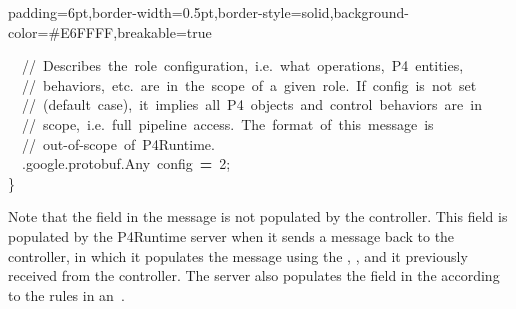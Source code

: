 \documentclass[11pt]{article}
\begin{document}
{\begin{mdbmargintb}{6pt}{6pt}
\begin{mdblock}{padding=6pt,border-width=0.5pt,border-style=solid,background-color=\#E6FFFF,breakable=true}
\begin{mdpre}
{{~~{//~Describes~the~role~configuration,~i.e.~what~operations,~P4~entities,}\\
~~{//~behaviors,~etc.~are~in~the~scope~of~a~given~role.~If~config~is~not~set}\\
~~{//~(default~case),~it~implies~all~P4~objects~and~control~behaviors~are~in}\\
~~{//~scope,~i.e.~full~pipeline~access.~The~format~of~this~message~is}\\
~~{//~out-of-scope~of~P4Runtime.}\\
~~.google.protobuf.Any~config~{\bfseries{=}}~{2};\\
\}}}%
\end{mdpre}%
\end{mdblock}%
\end{mdbmargintb}%

\noindent{}Note that the  field in the  message is not
populated by the controller. This field is populated by the P4Runtime server
when it sends a  message back to the controller, in which
it populates the  message using the ,
, and  it previously received from the controller. The server
also populates the  field in the  according to
the rules in an~.%

}
\end{document}
